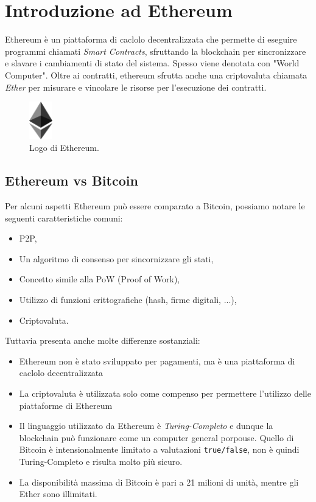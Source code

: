 \chapter{Introduzione ad Ethereum}
Ethereum è un piattaforma di caclolo decentralizzata che permette di eseguire programmi
chiamati \textit{Smart Contracts},
sfruttando la blockchain per sincronizzare e slavare i cambiamenti di stato del sistema.
Spesso viene denotata con "World Computer".
Oltre ai contratti, ethereum sfrutta anche una criptovaluta chiamata \textit{Ether} per
misurare e vincolare le risorse per l'esecuzione dei contratti.


\begin{figure}[H]
      \centering
      \includegraphics[width=1cm, keepaspectratio]{capitoli/ethereum/imgs/ethereum.png}
      \caption{Logo di Ethereum.}
\end{figure}

\section{Ethereum vs Bitcoin}
Per alcuni aspetti Ethereum può essere comparato a Bitcoin,
possiamo notare le seguenti caratteristiche comuni:

\begin{itemize}
      \item P2P,
      \item Un algoritmo di consenso per sincornizzare gli stati,
      \item Concetto simile alla PoW (Proof of Work),
      \item Utilizzo di funzioni crittografiche (hash, firme digitali, ...),
      \item Criptovaluta.
\end{itemize}

Tuttavia presenta anche molte differenze sostanziali:

\begin{itemize}
      \item Ethereum non è stato sviluppato per pagamenti, ma è una piattaforma di caclolo
            decentralizzata
      \item La criptovaluta è utilizzata solo come compenso per permettere
            l'utilizzo delle piattaforme di Ethereum
      \item Il linguaggio utilizzato da Ethereum è \textit{Turing-Completo} e dunque
            la blockchain può funzionare come un computer general porpouse.
            Quello di Bitcoin è intensionalmente limitato a valutazioni \verb|true/false|,
            non è quindi Turing-Completo e risulta molto più sicuro.
      \item La disponibilità massima di Bitcoin è pari a 21 milioni di unità, mentre gli
            Ether sono illimitati.
\end{itemize}

